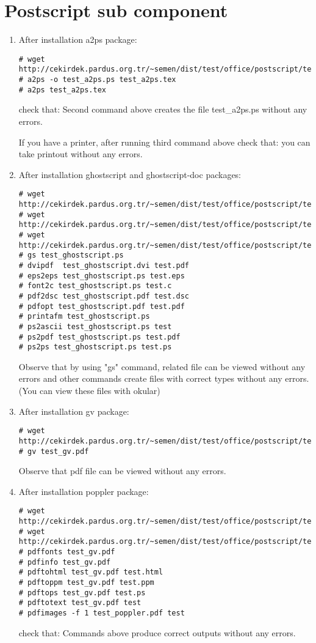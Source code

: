 \documentclass[a4paper,10pt]{article}
\begin{document}
\section{ Postscript sub component}
\begin{enumerate}
\item After installation a2ps package:
\begin{verbatim}
# wget http://cekirdek.pardus.org.tr/~semen/dist/test/office/postscript/test_a2ps.tex
# a2ps -o test_a2ps.ps test_a2ps.tex
# a2ps test_a2ps.tex
\end{verbatim}

check that: Second command above creates the file test\_a2ps.ps without any errors.

If you have a printer, after running third command above  check that: you can take printout without any errors.

\item After installation ghostscript and ghostscript-doc packages:
\begin{verbatim}
# wget http://cekirdek.pardus.org.tr/~semen/dist/test/office/postscript/test_ghostscript.ps
# wget http://cekirdek.pardus.org.tr/~semen/dist/test/office/postscript/test_ghostscript.dvi
# wget http://cekirdek.pardus.org.tr/~semen/dist/test/office/postscript/test_ghostscript.pdf
# gs test_ghostscript.ps
# dvipdf  test_ghostscript.dvi test.pdf
# eps2eps test_ghostscript.ps test.eps
# font2c test_ghostscript.ps test.c
# pdf2dsc test_ghostscript.pdf test.dsc
# pdfopt test_ghostscript.pdf test.pdf
# printafm test_ghostscript.ps
# ps2ascii test_ghostscript.ps test
# ps2pdf test_ghostscript.ps test.pdf
# ps2ps test_ghostscript.ps test.ps
\end{verbatim}

Observe that by using "gs" command, related file can be viewed without any errors and other commands create files with correct types without any errors. (You can view these files with okular)

\item After installation gv package:
\begin{verbatim}
# wget http://cekirdek.pardus.org.tr/~semen/dist/test/office/postscript/test_gv.pdf
# gv test_gv.pdf
\end{verbatim}

Observe that pdf file can be viewed without any errors.

\item After installation poppler package:
\begin{verbatim}
# wget http://cekirdek.pardus.org.tr/~semen/dist/test/office/postscript/test_gv.pdf
# wget http://cekirdek.pardus.org.tr/~semen/dist/test/office/postscript/test_poppler.pdf
# pdffonts test_gv.pdf
# pdfinfo test_gv.pdf
# pdftohtml test_gv.pdf test.html
# pdftoppm test_gv.pdf test.ppm
# pdftops test_gv.pdf test.ps
# pdftotext test_gv.pdf test
# pdfimages -f 1 test_poppler.pdf test
\end{verbatim}

check that: Commands above produce correct outputs  without any errors.
\end{enumerate}
\end{document}
